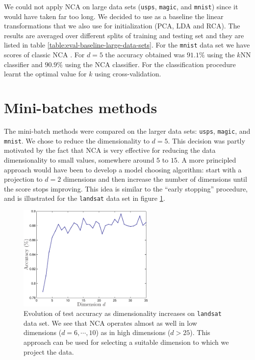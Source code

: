 We could not apply NCA on large data sets (\texttt{usps}, \texttt{magic}, and \texttt{mnist}) since it would have taken far too long. We decided to use as a baseline the linear transformations that we also use for initialization (PCA, LDA and RCA). The results are averaged over different splits of training and testing set and they are listed in table \ref{table:eval-baseline-large-data-sets}. For the \texttt{mnist} data set we have scores of classic NCA \citep{singh2010}. For $d=5$ the accuracy obtained was $91.1\%$ using the $k$NN classifier and $90.9\%$ using the NCA classifier. For the classification procedure \citeauthor{singh2010} learnt the optimal value for $k$ using cross-validation.

\section{Mini-batches methods}
\label{sec:method-comparison}

 The mini-batch methods were compared on the larger data sets: \texttt{usps}, \texttt{magic}, and \texttt{mnist}. We chose to reduce the dimensionality to $d=5$. This decision was partly motivated by the fact that NCA is very effective for reducing the data dimensionality to small values, somewhere around $5$ to $15$. A more principled approach would have been to develop a model choosing algorithm: start with a projection to $d=2$ dimensions and then increase the number of dimensions until the score stops improving. This idea is similar to the ``early stopping'' procedure, and is illustrated for the \texttt{landsat} data set in figure \ref{fig:landsat-evolution}.

  \begin{figure}
   \centering\includegraphics[width=0.6\textwidth]{images/landsat-evolution}
   \caption[Test accuracy as function of reduced dimensionality $d$ on the \texttt{landsat} data]{Evolution of test accuracy as dimensionality increases on \texttt{landsat} data set. We see that NCA operates almost as well in low dimensions ($d=6,\cdots,10$) as in high dimensions ($d>25$). This approach can be used for selecting a suitable dimension to which we project the data.}
   \label{fig:landsat-evolution}
  \end{figure}


